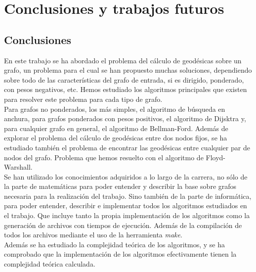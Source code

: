 
\chapter{Conclusiones y trabajos futuros}\label{ch:sexto-capitulo}

\section{Conclusiones}

En este trabajo se ha abordado el problema del cálculo de geodésicas sobre un grafo, un problema para el cual se han propuesto muchas soluciones, dependiendo sobre todo de las características del grafo de entrada, si es dirigido, ponderado, con pesos negativos, etc. Hemos estudiado los algoritmos principales que existen para resolver este problema para cada tipo de grafo. \\

Para grafos no ponderados, los más simples, el algoritmo de búsqueda en anchura, para grafos ponderados con pesos positivos, el algoritmo de Dijsktra y, para cualquier grafo en general, el algoritmo de Bellman-Ford. Además de explorar el problema del cálculo de geodésicas entre dos nodos fijos, se ha estudiado también el problema de encontrar las geodésicas entre cualquier par de nodos del grafo. Problema que hemos resuelto con el algoritmo de Floyd-Warshall. \\

Se han utilizado los conocimientos adquiridos a lo largo de la carrera, no sólo de la parte de matemáticas para poder entender y describir la base sobre grafos necesaria para la realización del trabajo. Sino también de la parte de informática, para poder entender, describir e implementar todos los algoritmos estudiados en el trabajo. Que incluye tanto la propia implementación de los algoritmos como la generación de archivos con tiempos de ejecución. Además de la compilación de todos los archivos mediante el uso de la herramienta \textit{make}. \\

Además se ha estudiado la complejidad teórica de los algoritmos, y se ha comprobado que la implementación de los algoritmos efectivamente tienen la complejidad teórica calculada.

